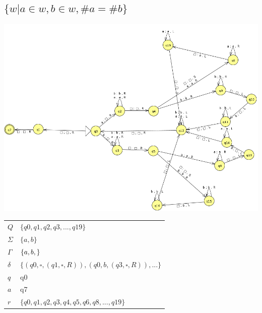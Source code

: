 \documentclass{jhwhw}
\begin{document}
\subsection{$\{w|a \in w, b\in w, \#a = \#b\}$}
\begin{center}
\includegraphics[width=\linewidth]{imgs/maquina4.png}
\begin{table}[h]
\begin{tabular}{l|l}
$Q$      & $\{q0,q1,q2,q3,...,q19\}$\\
$\Sigma$ &  $\{a,b\}$\\
$\Gamma$ &  $\{a,b,\empty\}$\\
$\delta$  &  $\{(q0,\square,(q1,\square,R)),(q0,b,(q3,\square,R)),...\}$\\
$q$      &  q0\\
$a$      &  q7\\
$r$      & $\{q0,q1,q2,q3,q4,q5,q6,q8,...,q19\}$
\end{tabular}
\end{table}
\end{center}
\end{document}
